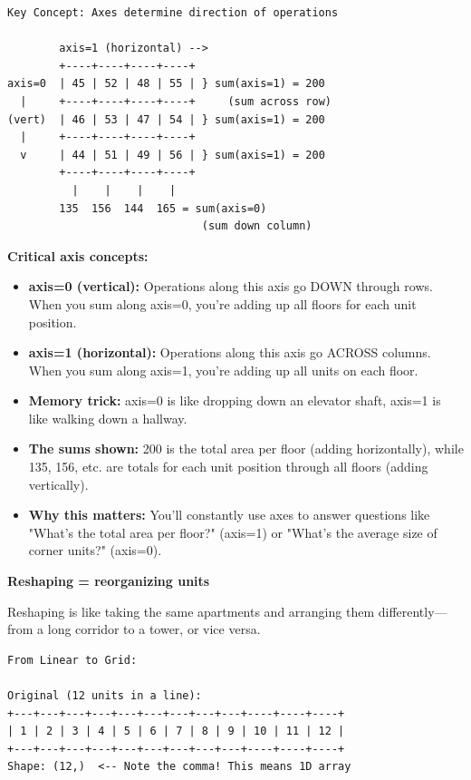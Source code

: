 \begin{tcolorbox}[
    title=Visualizing arrays as buildings,
    colframe=purple,
    colback = white,
    arc=2mm,
    breakable
]
\begin{lstlisting}[basicstyle=\ttfamily\footnotesize,breaklines=true,columns=fullflexible,keepspaces=true,xleftmargin=0pt]
Key Concept: Axes determine direction of operations

        axis=1 (horizontal) -->
        +----+----+----+----+
axis=0  | 45 | 52 | 48 | 55 | } sum(axis=1) = 200
  |     +----+----+----+----+     (sum across row)
(vert)  | 46 | 53 | 47 | 54 | } sum(axis=1) = 200
  |     +----+----+----+----+
  v     | 44 | 51 | 49 | 56 | } sum(axis=1) = 200
        +----+----+----+----+
          |    |    |    |
        135  156  144  165 = sum(axis=0)
                              (sum down column)
\end{lstlisting}

\textbf{Critical axis concepts:}
\begin{itemize}
\item \textbf{axis=0 (vertical):} Operations along this axis go DOWN through rows. When you sum along axis=0, you're adding up all floors for each unit position.
\item \textbf{axis=1 (horizontal):} Operations along this axis go ACROSS columns. When you sum along axis=1, you're adding up all units on each floor.
\item \textbf{Memory trick:} axis=0 is like dropping down an elevator shaft, axis=1 is like walking down a hallway.
\item \textbf{The sums shown:} 200 is the total area per floor (adding horizontally), while 135, 156, etc. are totals for each unit position through all floors (adding vertically).
\item \textbf{Why this matters:} You'll constantly use axes to answer questions like "What's the total area per floor?" (axis=1) or "What's the average size of corner units?" (axis=0).
\end{itemize}
\vspace{2em}

\textbf{Reshaping = reorganizing units}

Reshaping is like taking the same apartments and arranging them differently---from a long corridor to a tower, or vice versa.

\begin{lstlisting}[basicstyle=\ttfamily\footnotesize,breaklines=true,columns=fullflexible,keepspaces=true,xleftmargin=0pt]
From Linear to Grid:

Original (12 units in a line):
+---+---+---+---+---+---+---+---+---+----+----+----+
| 1 | 2 | 3 | 4 | 5 | 6 | 7 | 8 | 9 | 10 | 11 | 12 |
+---+---+---+---+---+---+---+---+---+----+----+----+
Shape: (12,)  <-- Note the comma! This means 1D array


\end{lstlisting}
\end{tcolorbox}
